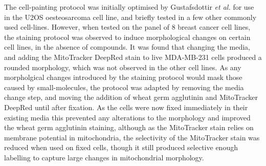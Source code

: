 \documentclass[a4paper,11pt,twoside,openright]{scrbook}
\begin{document}
The cell-painting protocol was initially optimised by Gustafsdottir \textit{et al.} for use in the U2OS oesteosarcoma cell line, and briefly tested in a few other commonly used cell-lines.
However, when tested on the panel of 8 breast cancer cell lines, the staining protocol was observed to induce morphological changes on certain cell lines, in the absence of compounds.
It was found that changing the media, and adding the MitoTracker DeepRed stain to live MDA-MB-231 cells produced a rounded morphology, which was not observed in the other cell lines.  %
As any morpholgical changes introduced by the staining protocol would mask those caused by small-molecules, the protocol was adapted by removing the media change step, and moving the addition of wheat germ agglutinin and MitoTracker DeepRed until after fixation.
As the cells were now fixed immediately in their existing media this prevented any alterations to the morphology and improved the wheat germ agglutinin staining, although as the MitoTracker stain relies on membrane potential in mitochondria, the selectivity of the MitoTracker stain was reduced when used on fixed cells, though it still produced selective enough labelling to capture large changes in mitochondrial morphology.

\end{document}

